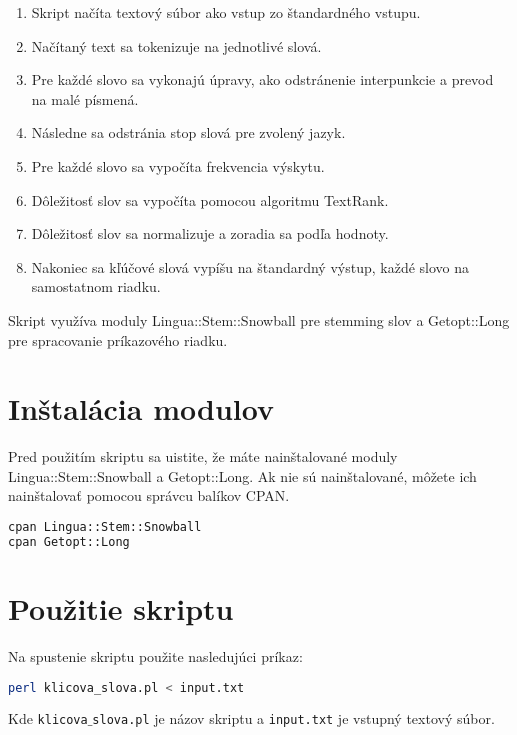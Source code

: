 \documentclass{article}
\begin{document}
\begin{enumerate}
  \item Skript načíta textový súbor ako vstup zo štandardného vstupu.
  \item Načítaný text sa tokenizuje na jednotlivé slová.
  \item Pre každé slovo sa vykonajú úpravy, ako odstránenie interpunkcie a prevod na malé písmená.
  \item Následne sa odstránia stop slová pre zvolený jazyk.
  \item Pre každé slovo sa vypočíta frekvencia výskytu.
  \item Dôležitosť slov sa vypočíta pomocou algoritmu TextRank.
  \item Dôležitosť slov sa normalizuje a zoradia sa podľa hodnoty.
  \item Nakoniec sa kľúčové slová vypíšu na štandardný výstup, každé slovo na samostatnom riadku.
\end{enumerate}

Skript využíva moduly Lingua::Stem::Snowball pre stemming slov a Getopt::Long pre spracovanie príkazového riadku.

\section{Inštalácia modulov}

Pred použitím skriptu sa uistite, že máte nainštalované moduly Lingua::Stem::Snowball a Getopt::Long. Ak nie sú nainštalované, môžete ich nainštalovať pomocou správcu balíkov CPAN.

\begin{lstlisting}[language=bash]
cpan Lingua::Stem::Snowball
cpan Getopt::Long
\end{lstlisting}

\section{Použitie skriptu}

Na spustenie skriptu použite nasledujúci príkaz:

\begin{lstlisting}[language=bash]
perl klicova_slova.pl < input.txt
\end{lstlisting}

Kde \texttt{klicova$\_$slova.pl} je názov skriptu a \texttt{input.txt} je vstupný textový súbor.
\end{document}
